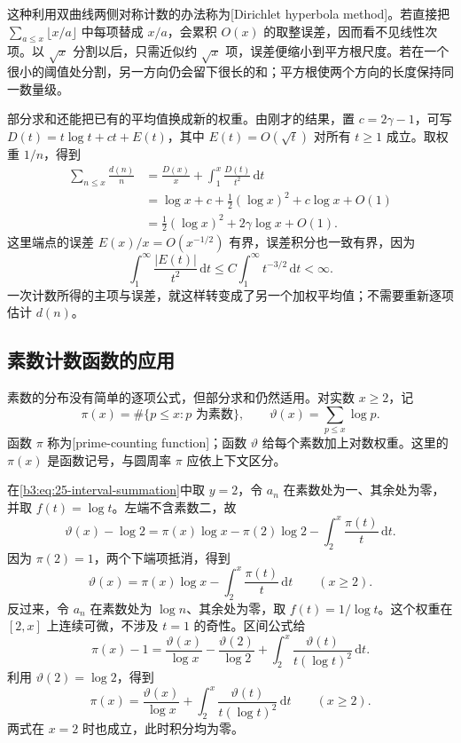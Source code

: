 这种利用双曲线两侧对称计数的办法称为[Dirichlet hyperbola method]。若直接把 \(\sum_{a\le x}\lfloor x/a\rfloor\) 中每项替成 \(x/a\)，会累积 \(O(x)\) 的取整误差，因而看不见线性次项。以 \(\sqrt x\) 分割以后，只需近似约 \(\sqrt x\) 项，误差便缩小到平方根尺度。若在一个很小的阈值处分割，另一方向仍会留下很长的和；平方根使两个方向的长度保持同一数量级。

部分求和还能把已有的平均值换成新的权重。由刚才的结果，置 \(c=2\gamma-1\)，可写 \(D(t)=t\log t+ct+E(t)\)，其中 \(E(t)=O(\sqrt t)\) 对所有 \(t\ge1\) 成立。取权重 \(1/n\)，得到
\begin{align*}
 \sum_{n\le x}\frac{d(n)}n
 &=\frac{D(x)}x+\int_1^x\frac{D(t)}{t^2}\,\mathrm dt\\
 &=\log x+c+\frac12(\log x)^2+c\log x+O(1)\\
 &=\frac12(\log x)^2+2\gamma\log x+O(1).
\end{align*}
这里端点的误差 \(E(x)/x=O(x^{-1/2})\) 有界，误差积分也一致有界，因为
\[
 \int_1^\infty\frac{|E(t)|}{t^2}\,\mathrm dt
 \le C\int_1^\infty t^{-3/2}\,\mathrm dt<\infty.
\]
一次计数所得的主项与误差，就这样转变成了另一个加权平均值；不需要重新逐项估计 \(d(n)\)。

\subsection{素数计数函数的应用}
\label{b3:subsec:250305}

素数的分布没有简单的逐项公式，但部分求和仍然适用。对实数 \(x\ge2\)，记
\[
 \pi(x)=\#\{p\le x:p\text{ 为素数}\},\qquad
 \vartheta(x)=\sum_{p\le x}\log p.
\]
函数 \(\pi\) 称为[prime-counting function]；函数 \(\vartheta\) 给每个素数加上对数权重。这里的 \(\pi(x)\) 是函数记号，与圆周率 \(\pi\) 应依上下文区分。

在\eqref{b3:eq:25-interval-summation}中取 \(y=2\)，令 \(a_n\) 在素数处为一、其余处为零，并取 \(f(t)=\log t\)。左端不含素数二，故
\[
 \vartheta(x)-\log2
 =\pi(x)\log x-\pi(2)\log2-\int_2^x\frac{\pi(t)}t\,\mathrm dt.
\]
因为 \(\pi(2)=1\)，两个下端项抵消，得到
\begin{equation}\label{b3:eq:25-prime-log-weight}
 \vartheta(x)=\pi(x)\log x-\int_2^x\frac{\pi(t)}t\,\mathrm dt
 \qquad(x\ge2).
\end{equation}
反过来，令 \(a_n\) 在素数处为 \(\log n\)、其余处为零，取 \(f(t)=1/\log t\)。这个权重在 \([2,x]\) 上连续可微，不涉及 \(t=1\) 的奇性。区间公式给
\[
 \pi(x)-1
 =\frac{\vartheta(x)}{\log x}-\frac{\vartheta(2)}{\log2}
       +\int_2^x\frac{\vartheta(t)}{t(\log t)^2}\,\mathrm dt.
\]
利用 \(\vartheta(2)=\log2\)，得到
\begin{equation}\label{b3:eq:25-prime-remove-weight}
 \pi(x)=\frac{\vartheta(x)}{\log x}
       +\int_2^x\frac{\vartheta(t)}{t(\log t)^2}\,\mathrm dt
 \qquad(x\ge2).
\end{equation}
两式在 \(x=2\) 时也成立，此时积分均为零。

